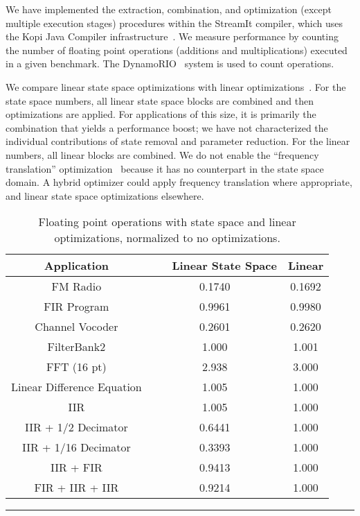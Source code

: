 \label{sec:results}

We have implemented the extraction, combination, and optimization
(except multiple execution stages) procedures within the StreamIt
compiler, which uses the Kopi Java Compiler
infrastructure~\cite{kopi}. We measure performance by counting the
number of floating point operations (additions and multiplications)
executed in a given benchmark. The DynamoRIO~\cite{dynamo} system is
used to count operations.

We compare linear state space optimizations with linear
optimizations~\cite{Lamb}.  For the state space numbers, all linear
state space blocks are combined and then optimizations are applied.
For applications of this size, it is primarily the combination that
yields a performance boost; we have not characterized the individual
contributions of state removal and parameter reduction.  For the
linear numbers, all linear blocks are combined.  We do not enable the
``frequency translation'' optimization~\cite{Lamb} because it has no
counterpart in the state space domain.  A hybrid optimizer could apply
frequency translation where appropriate, and linear state space
optimizations elsewhere.

\begin{table}[tbp]
\small
\begin{center}
\begin{tabular} {|c|c|c|} \hline
{\bf Application} & {\bf ~~~Linear State Space} & {\bf Linear} \\ \hline \hline
FM Radio & 0.1740 & 0.1692 \\ \hline
FIR Program &  0.9961 & 0.9980 \\ \hline
Channel Vocoder & 0.2601 & 0.2620 \\ \hline
FilterBank2 & 1.000 & 1.001 \\ \hline
FFT (16 pt) & 2.938 & 3.000 \\ \hline
Linear Difference Equation & 1.005 & 1.000 \\ \hline
IIR & 1.005 & 1.000 \\ \hline
IIR + 1/2 Decimator & 0.6441 & 1.000 \\ \hline
IIR + 1/16 Decimator & 0.3393 & 1.000 \\ \hline
IIR + FIR & 0.9413 & 1.000 \\ \hline
FIR + IIR + IIR & 0.9214 & 1.000 \\ \hline
\end{tabular}
\begin{minipage}{4in}
\caption{Floating point operations with state space and linear
optimizations, normalized to no optimizations.\protect\label{tab:results}}
\end{minipage}
\vspace{6pt}
\hrule
\end{center}
\vspace{-24pt}
\end{table}

